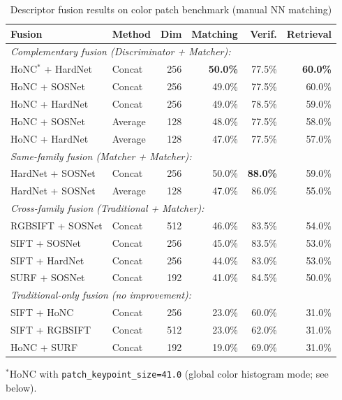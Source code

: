 \begin{table}[ht]
\centering
\caption{Descriptor fusion results on color patch benchmark (manual NN matching)}
\label{tab:patch_fusion}
\begin{tabular}{llrrrr}
\toprule
\textbf{Fusion} & \textbf{Method} & \textbf{Dim} & \textbf{Matching} & \textbf{Verif.} & \textbf{Retrieval} \\
\midrule
\multicolumn{6}{l}{\textit{Complementary fusion (Discriminator + Matcher):}} \\
HoNC$^*$ + HardNet & Concat & 256 & \textbf{50.0\%} & 77.5\% & \textbf{60.0\%} \\
HoNC + SOSNet & Concat & 256 & 49.0\% & 77.5\% & 60.0\% \\
HoNC + HardNet & Concat & 256 & 49.0\% & 78.5\% & 59.0\% \\
HoNC + SOSNet & Average & 128 & 48.0\% & 77.5\% & 58.0\% \\
HoNC + HardNet & Average & 128 & 47.0\% & 77.5\% & 57.0\% \\
\midrule
\multicolumn{6}{l}{\textit{Same-family fusion (Matcher + Matcher):}} \\
HardNet + SOSNet & Concat & 256 & 50.0\% & \textbf{88.0\%} & 59.0\% \\
HardNet + SOSNet & Average & 128 & 47.0\% & 86.0\% & 55.0\% \\
\midrule
\multicolumn{6}{l}{\textit{Cross-family fusion (Traditional + Matcher):}} \\
RGBSIFT + SOSNet & Concat & 512 & 46.0\% & 83.5\% & 54.0\% \\
SIFT + SOSNet & Concat & 256 & 45.0\% & 83.5\% & 53.0\% \\
SIFT + HardNet & Concat & 256 & 44.0\% & 83.0\% & 53.0\% \\
SURF + SOSNet & Concat & 192 & 41.0\% & 84.5\% & 50.0\% \\
\midrule
\multicolumn{6}{l}{\textit{Traditional-only fusion (no improvement):}} \\
SIFT + HoNC & Concat & 256 & 23.0\% & 60.0\% & 31.0\% \\
SIFT + RGBSIFT & Concat & 512 & 23.0\% & 62.0\% & 31.0\% \\
HoNC + SURF & Concat & 192 & 19.0\% & 69.0\% & 31.0\% \\
\bottomrule
\end{tabular}
\end{table}

\noindent$^*$HoNC with \texttt{patch\_keypoint\_size=41.0} (global color histogram mode; see below).

